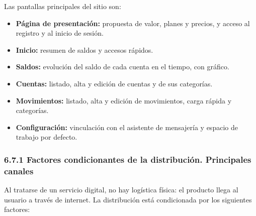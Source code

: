 Las pantallas principales del sitio son:

\begin{itemize}
\item
  \textbf{Página de presentación:} propuesta de valor, planes y precios,
  y acceso al registro y al inicio de sesión.
\item
  \textbf{Inicio:} resumen de saldos y accesos rápidos.
\item
  \textbf{Saldos:} evolución del saldo de cada cuenta en el tiempo, con
  gráfico.
\item
  \textbf{Cuentas:} listado, alta y edición de cuentas y de sus
  categorías.
\item
  \textbf{Movimientos:} listado, alta y edición de movimientos, carga
  rápida y categorías.
\item
  \textbf{Configuración:} vinculación con el asistente de mensajería y
  espacio de trabajo por defecto.
\end{itemize}


\subsubsection*{6.7.1 Factores condicionantes de la distribución.
Principales
canales}\label{factores-condicionantes-de-la-distribuciuxf3n.-principales-canales}

Al tratarse de un servicio digital, no hay logística física: el producto
llega al usuario a través de internet. La distribución está condicionada
por los siguientes factores:

